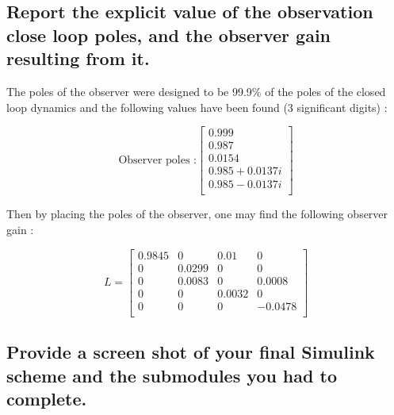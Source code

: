 \subsection{Report the explicit value of the observation close loop poles, and the observer gain resulting
from it.}
The poles of the observer were designed to be 99.9\% of the poles of the closed loop dynamics and the following values have been found (3 significant digits) :

\begin{equation}
    \text{Observer poles :}
    \left[\begin{array}{c}
         0.999\\
         0.987\\
         0.0154\\
         0.985 + 0.0137i\\
         0.985 - 0.0137i\\
    \end{array}
    \right]
\end{equation}

Then by placing the poles of the observer, one may find the following observer gain :

\begin{equation}
    L = 
    \left[ {\begin{array}{ccccc}
        0.9845 &0      &0.01   &0         \\
        0      &0.0299 &0      &0         \\
        0      &0.0083 &0      &0.0008    \\
        0      &0      &0.0032 &0         \\
        0      &0      &0      &-0.0478   \\
    \end{array} } \right] 
\end{equation}

\subsection{Provide a screen shot of your final Simulink scheme and the submodules you had to complete.}

